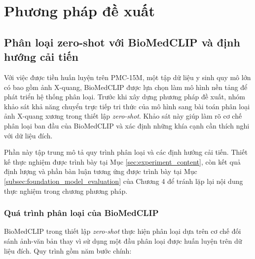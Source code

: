 \chapter{Phương pháp đề xuất}
\label{Chapter3}

\section{Phân loại zero-shot với BioMedCLIP và định hướng cải tiến}
\label{sec:ch3_biomedclip_baseline}

Với việc được tiền huấn luyện trên PMC-15M, một tập dữ liệu y sinh quy mô lớn có bao gồm ảnh X-quang, BioMedCLIP \cite{BiomedCLIP} được lựa chọn làm mô hình nền tảng để phát triển hệ thống phân loại. Trước khi xây dựng phương pháp đề xuất, nhóm khảo sát khả năng chuyển trực tiếp tri thức của mô hình sang bài toán phân loại ảnh X-quang xương trong thiết lập \textit{zero-shot}. Khảo sát này giúp làm rõ cơ chế phân loại ban đầu của BioMedCLIP và xác định những khía cạnh cần thích nghi với dữ liệu đích.

Phần này tập trung mô tả quy trình phân loại và các định hướng cải tiến. Thiết kế thực nghiệm được trình bày tại Mục \ref{sec:experiment_content}, còn kết quả định lượng và phần bàn luận tương ứng được trình bày tại Mục \ref{subsec:foundation_model_evaluation} của Chương 4 để tránh lặp lại nội dung thực nghiệm trong chương phương pháp.

\subsection{Quá trình phân loại của BioMedCLIP}
\label{subsec:ch3_biomedclip_classification}

BioMedCLIP trong thiết lập \textit{zero-shot} thực hiện phân loại dựa trên cơ chế đối sánh ảnh-văn bản thay vì sử dụng một đầu phân loại được huấn luyện trên dữ liệu đích. Quy trình gồm năm bước chính:

